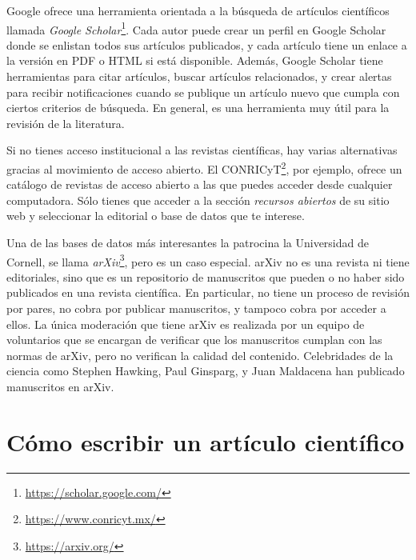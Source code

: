 Google ofrece una herramienta orientada a la búsqueda de artículos científicos
llamada \emph{Google Scholar}\footnote{\href{https://scholar.google.com/}%
    {\url{https://scholar.google.com/}}}.
Cada autor puede crear un perfil en Google Scholar donde se enlistan todos sus
artículos publicados, y cada artículo tiene un enlace a la versión en PDF o HTML
si está disponible.
Además, Google Scholar tiene herramientas para citar artículos, buscar artículos
relacionados, y crear alertas para recibir notificaciones cuando se publique un
artículo nuevo que cumpla con ciertos criterios de búsqueda.
En general, es una herramienta muy útil para la revisión de la literatura.

Si no tienes acceso institucional a las revistas científicas, hay varias
alternativas gracias al movimiento de acceso abierto.
El CONRICyT\footnote{\href{https://www.conricyt.mx/}%
    {\url{https://www.conricyt.mx/}}}, por ejemplo, ofrece un catálogo de
revistas de acceso abierto a las que puedes acceder desde cualquier computadora.
Sólo tienes que acceder a la sección \emph{recursos abiertos} de su sitio web y
seleccionar la editorial o base de datos que te interese.

Una de las bases de datos más interesantes la patrocina la Universidad de
Cornell, se llama \emph{arXiv}\footnote{\href{https://arxiv.org/}%
    {\url{https://arxiv.org/}}}, pero es un caso especial.
arXiv no es una revista ni tiene editoriales, sino que  es un repositorio de
manuscritos que pueden o no haber sido publicados en una revista científica.
En particular, no tiene un proceso de revisión por pares, no cobra por publicar
manuscritos, y tampoco cobra por acceder a ellos.
La única moderación que tiene arXiv es realizada por un equipo de voluntarios
que se encargan de verificar que los manuscritos cumplan con las normas de
arXiv, pero no verifican la calidad del contenido.
Celebridades de la ciencia como Stephen Hawking, Paul Ginsparg, y Juan Maldacena
han publicado manuscritos en arXiv.

\section{Cómo escribir un artículo científico}
\label{sec:comoescribir}